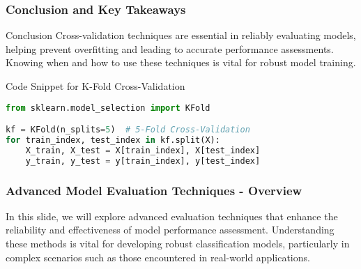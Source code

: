 \documentclass[aspectratio=169]{beamer}
\begin{document}
\begin{frame}[fragile]
    \frametitle{Conclusion and Key Takeaways}
    \begin{block}{Conclusion}
        Cross-validation techniques are essential in reliably evaluating models, helping prevent overfitting and leading to accurate performance assessments. Knowing when and how to use these techniques is vital for robust model training.
    \end{block}

    \begin{block}{Code Snippet for K-Fold Cross-Validation}
        \begin{lstlisting}[language=Python]
from sklearn.model_selection import KFold

kf = KFold(n_splits=5)  # 5-Fold Cross-Validation
for train_index, test_index in kf.split(X):
    X_train, X_test = X[train_index], X[test_index]
    y_train, y_test = y[train_index], y[test_index]
        \end{lstlisting}
    \end{block}
\end{frame}

\begin{frame}[fragile]
    \frametitle{Advanced Model Evaluation Techniques - Overview}
    In this slide, we will explore advanced evaluation techniques that enhance the reliability and effectiveness of model performance assessment. Understanding these methods is vital for developing robust classification models, particularly in complex scenarios such as those encountered in real-world applications.
\end{frame}
\end{document}
